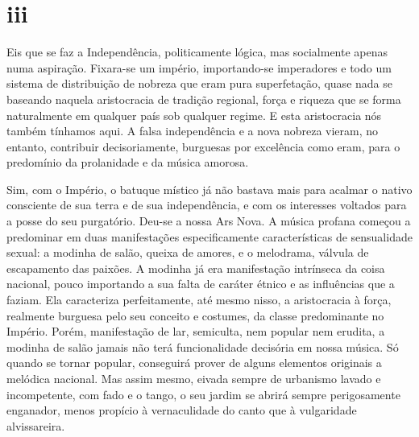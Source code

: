 \section*{iii}

Eis que se faz a Independência, politicamente lógica, mas socialmente
apenas numa aspiração. Fixara-se um império, importando-se imperadores e
todo um sistema de distribuição de nobreza que eram pura superfetação,
quase nada se baseando naquela aristocracia de tradição regional, força
e riqueza que se forma naturalmente em qualquer país sob qualquer
regime. E esta aristocracia nós também tínhamos aqui. A falsa
independência e a nova nobreza vieram, no entanto, contribuir
decisoriamente, burguesas por excelência como eram, para o predomínio da
prolanidade e da música amorosa.

Sim, com o Império, o batuque místico já não bastava mais para acalmar o
nativo consciente de sua terra e de sua independência, e com os
interesses voltados para a posse do seu purgatório. Deu-se a nossa Ars
Nova. A música profana começou a predominar em duas manifestações
especificamente características de sensualidade sexual: a modinha de
salão, queixa de amores, e o melodrama, válvula de escapamento das
paixões. A modinha já era manifestação intrínseca da coisa nacional,
pouco importando a sua falta de caráter étnico e as influências que a
faziam. Ela caracteriza perfeitamente, até mesmo nisso, a aristocracia à
força, realmente burguesa pelo seu conceito e costumes, da classe
predominante no Império. Porém, manifestação de lar, semiculta, nem
popular nem erudita, a modinha de salão jamais não terá funcionalidade
decisória em nossa música. Só quando se tornar popular, conseguirá
prover de alguns elementos originais a melódica nacional. Mas assim
mesmo, eivada sempre de urbanismo lavado e incompetente, com fado e o
tango, o seu jardim se abrirá sempre perigosamente enganador, menos
propício à vernaculidade do canto que à vulgaridade alvissareira.

